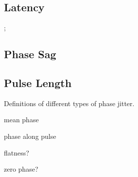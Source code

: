 \subsection{Latency}
\label{ss:availLatency};


\subsection{Phase Sag}
\label{ss:phaseSag}

\subsection{Pulse Length}
\label{ss:pulseLength}


Definitions of different types of phase jitter.


mean phase

phase along pulse

flatness?

zero phase?







